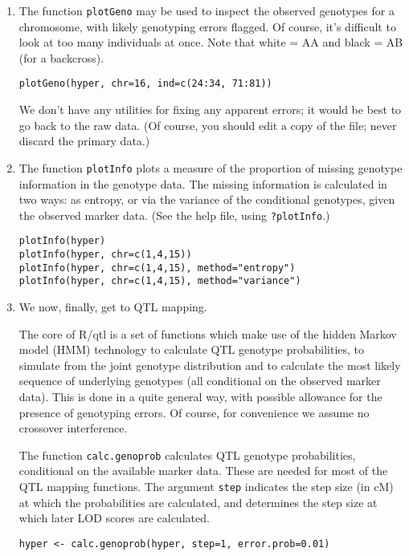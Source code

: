 \documentclass[10pt,letterpaper]{article}
\newcommand{\usercolor}{\color [named]{BlueViolet}}
\begin{document}
\begin{enumerate}
\item The function \verb-plotGeno- may be used to inspect the
observed genotypes for a chromosome, with likely genotyping errors
flagged.  Of course, it's difficult to look at too many individuals at
once.  Note that white = AA and black = AB (for a backcross).  

\usercolor
\verb|plotGeno(hyper, chr=16, ind=c(24:34, 71:81))|
\normalcolor

We don't have any utilities for fixing any apparent errors; it would
be best to go back to the raw data.  (Of course, you should edit a
copy of the file; never discard the primary data.)

\item The function \verb-plotInfo- plots a measure of the proportion
of missing genotype information in the genotype data.  The missing
information is calculated in two ways: as entropy, or via the
variance of the conditional genotypes, given the observed marker
data.  (See the help file, using \verb-?plotInfo-.)  

\usercolor
\verb|plotInfo(hyper)| \\
\verb|plotInfo(hyper, chr=c(1,4,15))| \\
\verb|plotInfo(hyper, chr=c(1,4,15), method="entropy")| \\
\verb|plotInfo(hyper, chr=c(1,4,15), method="variance")| 
\normalcolor


\item We now, finally, get to QTL mapping.  

The core of R/qtl is a set of functions which make use of the hidden
Markov model (HMM) technology to calculate QTL genotype probabilities,
to simulate from the joint genotype distribution and to calculate the
most likely sequence of underlying genotypes (all conditional on the
observed marker data).  This is done in a quite general way, with
possible allowance for the presence of genotyping errors.  Of course, 
for convenience we assume no crossover interference.  

The function \verb-calc.genoprob- calculates QTL genotype
probabilities, conditional on the available marker data. These are
needed for most of the QTL mapping functions.  The argument
\verb-step- indicates the step size (in cM) at which the probabilities
are calculated, and determines the step size at which later LOD scores
are calculated.

\usercolor
\verb|hyper <- calc.genoprob(hyper, step=1, error.prob=0.01)| \normalcolor


\end{enumerate}
\end{document}
